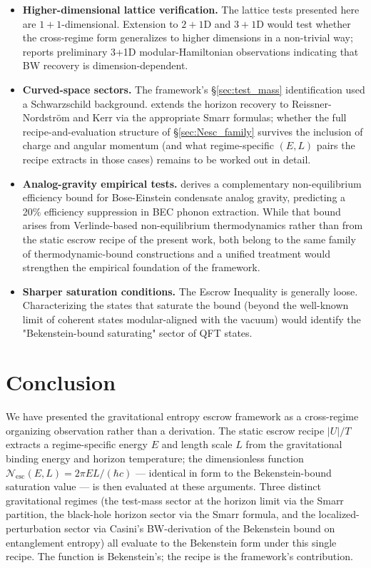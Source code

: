 \documentclass[11pt]{article}
\begin{document}
\begin{itemize}
\item \textbf{Higher-dimensional lattice verification.} The lattice tests presented here are $1{+}1$-dimensional. Extension to $2{+}1$D and $3{+}1$D would test whether the cross-regime form generalizes to higher dimensions in a non-trivial way; \cite{Whitmer2026Lattice} reports preliminary 3+1D modular-Hamiltonian observations indicating that BW recovery is dimension-dependent.
\item \textbf{Curved-space sectors.} The framework's \S\ref{sec:test_mass} identification used a Schwarzschild background. \cite{Whitmer2026Translation} extends the horizon recovery to Reissner-Nordström and Kerr via the appropriate Smarr formulas; whether the full recipe-and-evaluation structure of \S\ref{sec:Nesc_family} survives the inclusion of charge and angular momentum (and what regime-specific $(E, L)$ pairs the recipe extracts in those cases) remains to be worked out in detail.
\item \textbf{Analog-gravity empirical tests.} \cite{Whitmer2026Phonon} derives a complementary non-equilibrium efficiency bound for Bose-Einstein condensate analog gravity, predicting a 20\% efficiency suppression in BEC phonon extraction. While that bound arises from Verlinde-based non-equilibrium thermodynamics rather than from the static escrow recipe of the present work, both belong to the same family of thermodynamic-bound constructions and a unified treatment would strengthen the empirical foundation of the framework.
\item \textbf{Sharper saturation conditions.} The Escrow Inequality is generally loose. Characterizing the states that saturate the bound (beyond the well-known limit of coherent states modular-aligned with the vacuum) would identify the "Bekenstein-bound saturating" sector of QFT states.
\end{itemize}

\section{Conclusion}

We have presented the gravitational entropy escrow framework as a cross-regime organizing observation rather than a derivation. The static escrow recipe $|U|/T$ extracts a regime-specific energy $E$ and length scale $L$ from the gravitational binding energy and horizon temperature; the dimensionless function $\mathcal{N}_{\mathrm{esc}}(E, L) = 2\pi E L/(\hbar c)$ — identical in form to the Bekenstein-bound saturation value — is then evaluated at these arguments. Three distinct gravitational regimes (the test-mass sector at the horizon limit via the Smarr partition, the black-hole horizon sector via the Smarr formula, and the localized-perturbation sector via Casini's BW-derivation of the Bekenstein bound on entanglement entropy) all evaluate to the Bekenstein form under this single recipe. The function is Bekenstein's; the recipe is the framework's contribution.
\end{document}
